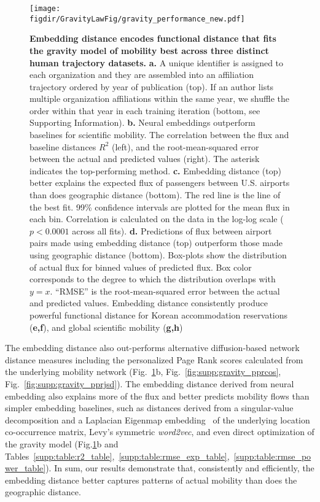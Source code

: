 \documentclass[12pt]{article} %
\def\figdir{../Figs}
\def\SI{Supporting Information}
\begin{document}
%
%
%
%
\begin{figure}[!htp]
	\centering
	\texttt{[image: \\figdir/GravityLawFig/gravity\_performance\_new.pdf]}
	\caption{
		\textbf{Embedding distance encodes functional distance that fits the gravity model of mobility best across three distinct human trajectory datasets. }
		\textbf{a.} A unique identifier is assigned to each organization and they are assembled into an affiliation trajectory ordered by year of publication (top). If an author lists multiple organization affiliations within the same year,  we shuffle the order within that year in each training iteration (bottom, see \SI).
		\textbf{b.} Neural embeddings outperform baselines for scientific mobility.
The correlation between the flux and baseline distances $R^{2}$ (left), and the  root-mean-squared error between the actual and predicted values (right). The asterisk indicates the top-performing method.
		\textbf{c.} Embedding distance (top) better explains the expected flux of passengers between U.S. airports than does geographic distance (bottom).
		The red line is the line of the best fit.
		99\% confidence intervals are plotted for the mean flux in each bin.
		Correlation is calculated on the data in the log-log scale ($p < 0.0001$ across all fits).
		\textbf{d.} Predictions of flux between airport pairs made using embedding distance (top) outperform those made using geographic distance (bottom).
		Box-plots show the distribution of actual flux for binned values of predicted flux.
		Box color corresponds to the degree to which the distribution overlaps with $y = x$.
		``RMSE'' is the root-mean-squared error between the actual and predicted values.
	Embedding distance consistently produce powerful functional distance for Korean accommodation reservations (\textbf{e,f}), and global scientific mobility (\textbf{g,h})}
	\label{fig:gravity_performance}
\end{figure}

The embedding distance also out-performs alternative diffusion-based network distance measures including the personalized Page Rank scores calculated from the underlying mobility network (Fig.~\ref{fig:gravity_performance}b, Fig.~\ref{fig:supp:gravity_pprcos}, Fig.~\ref{fig:supp:gravity_pprjsd}).
The embedding distance derived from neural embedding also explains more of the flux and better predicts mobility flows than simpler embedding baselines, such as distances derived from a singular-value decomposition and a Laplacian Eigenmap embedding~\autocite{belkin2003laplacian} of the underlying location co-occurrence matrix, Levy's symmetric \textit{word2vec}\autocite{levy2014neural}, and even direct optimization of the gravity model (Fig.\ref{fig:gravity_performance}b and Tables~\ref{supp:table:r2_table},~\ref{supp:table:rmse_exp_table},~\ref{supp:table:rmse_power_table}).
In sum, our results demonstrate that, consistently and efficiently, the embedding distance better captures patterns of actual mobility than does the geographic distance.
\end{document}
